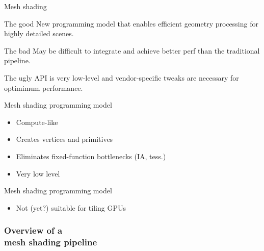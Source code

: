 \documentclass[aspectratio=169,t,xcolor=table]{beamer}
\begin{document}
\begin{frame}{Mesh shading}

    \footnotesize

    \begin{block}{The good}
        New programming model that enables efficient geometry processing for highly detailed scenes.
    \end{block}

    \begin{block}{The bad}
        May be difficult to integrate and achieve better perf than the traditional pipeline.
    \end{block}

    \begin{block}{The ugly}
        API is very low-level and vendor-specific tweaks are necessary for optimimum performance. 
    \end{block}

\end{frame}

\begin{frame}{Mesh shading programming model}

    \LARGE

    \begin{itemize}
    	\item Compute-like
    	\item Creates vertices and primitives
    	\item Eliminates fixed-function bottlenecks (IA, tess.)
    	\item Very low level
    \end{itemize}

\end{frame}

\begin{frame}{Mesh shading programming model}

    \LARGE

    \begin{itemize}
    	\item Not (yet?) suitable for tiling GPUs
    \end{itemize}

\end{frame}

\begin{frame}{}
    \frametitle{Overview of a \\ mesh shading pipeline}
\end{frame}
\end{document}
